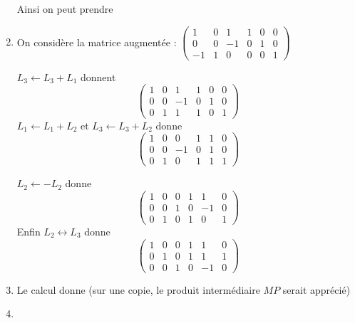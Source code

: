 \begin{correction}
\begin{enumerate}
Ainsi on peut prendre 

\item  On considère la matrice augmentée : 
$\left(\begin{array}{ccc|ccc}  
1&0&1 & 1&0&0 \\
0&0&-1& 0&1&0 \\
-1&1&0& 0&0&1 
\end{array}\right)$

$L_3\leftarrow L_3+L_1$  donnent
$$\left(\begin{array}{ccc|ccc}  
1&0&1 & 1&0&0 \\
0&0&-1& 0&1&0 \\
0&1&1& 1&0&1 
\end{array}\right)$$
$L_1\leftarrow L_1+L_2$ et $L_3\leftarrow L_3+L_2$
donne 
$$\left(\begin{array}{ccc|ccc}  
1&0&0 & 1&1&0 \\
0&0&-1& 0&1&0 \\
0&1&0& 1&1&1 
\end{array}\right)$$

$L_2\leftarrow -L_2$
donne 
$$\left(\begin{array}{ccc|ccc}  
1&0&0 & 1&1&0 \\
0&0&1& 0&-1&0 \\
0&1&0& 1&0&1 
\end{array}\right)$$
Enfin 
$L_2\leftrightarrow L_3$
donne 
$$\left(\begin{array}{ccc|ccc}  
1&0&0 & 1&1&0 \\
0&1&0& 1&1&1 \\
0&0&1& 0&-1&0 
\end{array}\right)$$


\item Le calcul donne  
(sur une copie, le produit intermédiaire $MP$ serait apprécié)

\item 



\end{enumerate}
\end{correction}
